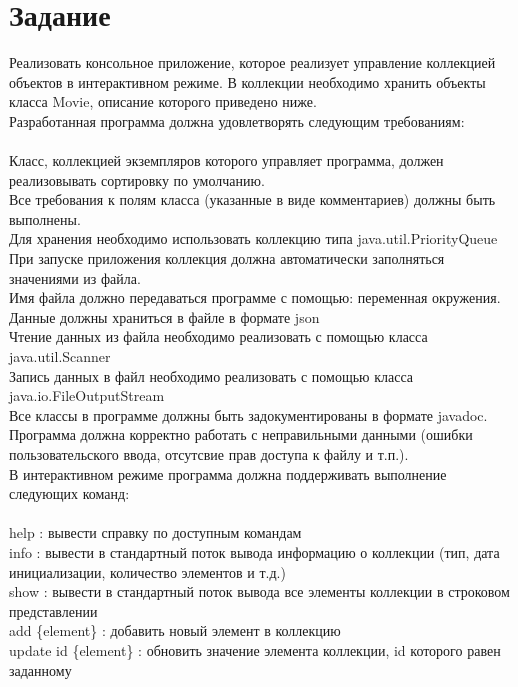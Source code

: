 

\section{Задание}
Реализовать консольное приложение, которое реализует управление коллекцией объектов в интерактивном режиме.
В коллекции необходимо хранить объекты класса Movie, описание которого приведено ниже.\\
Разработанная программа должна удовлетворять следующим требованиям:\\
\\
Класс, коллекцией экземпляров которого управляет программа, должен реализовывать сортировку по умолчанию.\\
Все требования к полям класса (указанные в виде комментариев) должны быть выполнены.\\
Для хранения необходимо использовать коллекцию типа java.util.PriorityQueue\\
При запуске приложения коллекция должна автоматически заполняться значениями из файла.\\
Имя файла должно передаваться программе с помощью: переменная окружения.\\
Данные должны храниться в файле в формате json\\
Чтение данных из файла необходимо реализовать с помощью класса java.util.Scanner\\
Запись данных в файл необходимо реализовать с помощью класса java.io.FileOutputStream\\
Все классы в программе должны быть задокументированы в формате javadoc.\\
Программа должна корректно работать с неправильными данными (ошибки пользовательского ввода, отсутсвие прав доступа к файлу и т.п.).\\
В интерактивном режиме программа должна поддерживать выполнение следующих команд:\\
\\
help : вывести справку по доступным командам\\
info : вывести в стандартный поток вывода информацию о коллекции (тип, дата инициализации, количество элементов и т.д.)\\
show : вывести в стандартный поток вывода все элементы коллекции в строковом представлении\\
add \{element\} : добавить новый элемент в коллекцию\\
update id \{element\} : обновить значение элемента коллекции, id которого равен заданному\\

